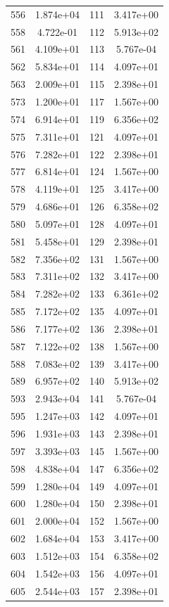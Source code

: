 \documentclass[12pt]{article}
\begin{document}
\begin{longtable}{@{}cccc@{}}
556 & 1.874e+04 & 111 & 3.417e+00 \\
558 & 4.722e-01 & 112 & 5.913e+02 \\
561 & 4.109e+01 & 113 & 5.767e-04 \\
562 & 5.834e+01 & 114 & 4.097e+01 \\
563 & 2.009e+01 & 115 & 2.398e+01 \\
573 & 1.200e+01 & 117 & 1.567e+00 \\
574 & 6.914e+01 & 119 & 6.356e+02 \\
575 & 7.311e+01 & 121 & 4.097e+01 \\
576 & 7.282e+01 & 122 & 2.398e+01 \\
577 & 6.814e+01 & 124 & 1.567e+00 \\
578 & 4.119e+01 & 125 & 3.417e+00 \\
579 & 4.686e+01 & 126 & 6.358e+02 \\
580 & 5.097e+01 & 128 & 4.097e+01 \\
581 & 5.458e+01 & 129 & 2.398e+01 \\
582 & 7.356e+02 & 131 & 1.567e+00 \\
583 & 7.311e+02 & 132 & 3.417e+00 \\
584 & 7.282e+02 & 133 & 6.361e+02 \\
585 & 7.172e+02 & 135 & 4.097e+01 \\
586 & 7.177e+02 & 136 & 2.398e+01 \\
587 & 7.122e+02 & 138 & 1.567e+00 \\
588 & 7.083e+02 & 139 & 3.417e+00 \\
589 & 6.957e+02 & 140 & 5.913e+02 \\
593 & 2.943e+04 & 141 & 5.767e-04 \\
595 & 1.247e+03 & 142 & 4.097e+01 \\
596 & 1.931e+03 & 143 & 2.398e+01 \\
597 & 3.393e+03 & 145 & 1.567e+00 \\
598 & 4.838e+04 & 147 & 6.356e+02 \\
599 & 1.280e+04 & 149 & 4.097e+01 \\
600 & 1.280e+04 & 150 & 2.398e+01 \\
601 & 2.000e+04 & 152 & 1.567e+00 \\
602 & 1.684e+04 & 153 & 3.417e+00 \\
603 & 1.512e+03 & 154 & 6.358e+02 \\
604 & 1.542e+03 & 156 & 4.097e+01 \\
605 & 2.544e+03 & 157 & 2.398e+01 \\

\end{longtable}
\end{document}
